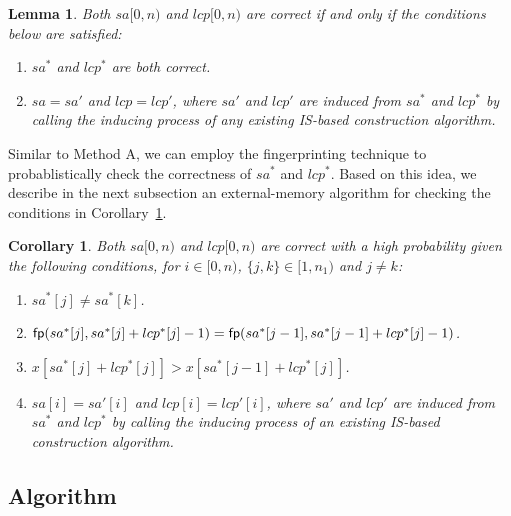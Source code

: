 \documentclass[10pt,journal,compsoc]{IEEEtran}
\newtheorem{Lemma}{Lemma}
\newtheorem{Corollary}{Corollary}
\begin{document}
\begin{Lemma} \label{lemma:2}
Both $sa[0, n)$ and $lcp[0, n)$ are correct if and only if the conditions below are satisfied:

\begin{enumerate}[(1)]
	\item
	$sa^*$ and $lcp^*$ are both correct.
	\item
	$sa = sa'$ and $lcp = lcp'$, where $sa'$ and $lcp'$ are induced from $sa^*$ and $lcp^*$ by calling the inducing process of any existing IS-based construction algorithm.
\end{enumerate}
\end{Lemma}

Similar to Method A, we can employ the fingerprinting technique to probablistically check the correctness of $sa^*$ and $lcp^*$. Based on this idea, we describe in the next subsection an external-memory algorithm for checking the conditions in Corollary~\ref{corollary:2}.

\begin{Corollary} \label{corollary:2}
Both $sa[0, n)$ and $lcp[0, n)$ are correct with a high probability given the following conditions, for $i \in [0, n)$, $\{j, k\} \in [1, n_1)$ and $j \ne k$:
	
\begin{enumerate}[(1)]
	\item
	$sa^*[j] \ne sa^*[k]$.
	\item
	${\sf fp}(sa^*[j], sa^*[j] + lcp^*[j] - 1) = {\sf fp}(sa^*[j - 1], sa^*[j - 1] + lcp^*[j] - 1)$.
	\item
	$x[sa^*[j] + lcp^*[j]] > x[sa^*[j - 1] + lcp^*[j]]$.
	\item
	$sa[i] = sa'[i]$ and $lcp[i] = lcp'[i]$, where $sa'$ and $lcp'$ are induced from $sa^*$ and $lcp^*$ by calling the inducing process of an existing IS-based construction algorithm.
\end{enumerate}

\end{Corollary}


\subsection{Algorithm} \label{sec:method2:algorithm}
\end{document}
